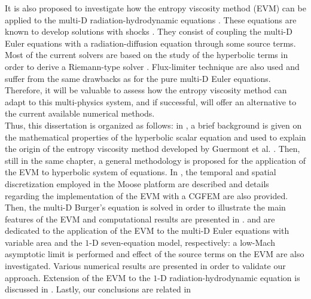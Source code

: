 It is also proposed to investigate how the entropy viscosity method (EVM) can be applied to the multi-D radiation-hydrodynamic equations \cite{LowrieMorelHittinger}. These equations are known to develop solutions with shocks \cite{Balsara}. They consist of coupling the multi-D Euler equations with a radiation-diffusion equation through some source terms.  Most of the current solvers are based on the study of the hyperbolic terms in order to derive a Riemann-type solver \cite{LowrieMorel}. Flux-limiter technique \cite{EdwardsMorelLowrie} are also used and suffer from the same drawbacks as for the pure multi-D Euler equations. Therefore, it will be valuable to assess how the entropy viscosity method can adapt to this multi-physics system, and if successful, will offer an alternative to the current available numerical methods.\\

Thus, this dissertation is organized as follows: in , a brief background is given on the mathematical properties of the hyperbolic scalar equation and used to explain the origin of the entropy viscosity method developed by Guermont et al. \cite{jlg1}. Then, still in the same chapter, a general methodology is proposed for the application of the EVM to hyperbolic system of equations. In , the temporal and spatial discretization employed in the Moose platform \cite{Moose} are described and details regarding the implementation of the EVM with a CGFEM are also provided. Then, the multi-D Burger's equation is solved in order to illustrate the main features of the EVM and computational results are presented in .  and  are dedicated to the application of the EVM to the multi-D Euler equations with variable area and the $1$-D seven-equation model, respectively: a low-Mach asymptotic limit is performed and effect of the source terms on the EVM are also investigated. Various numerical results are presented in order to validate our approach. Extension of the EVM to the $1$-D radiation-hydrodynamic equation is discussed in . Lastly, our conclusions are related in 
